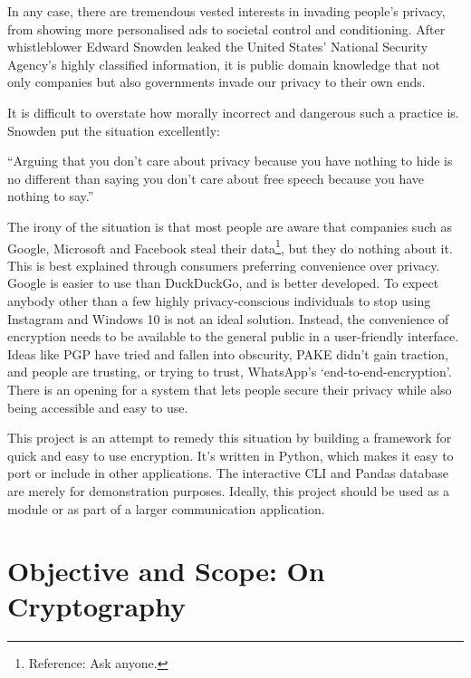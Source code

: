 \documentclass[titlepage]{article}
\begin{document}
In any case, there are tremendous vested interests in invading people's privacy, from showing more
personalised ads to societal control and conditioning. After whistleblower Edward Snowden leaked
the United States' National Security Agency's highly classified information, it is public domain
knowledge that not only companies but also governments invade our privacy to their own ends.

It is difficult to overstate how morally incorrect and dangerous such a practice is. Snowden put the
situation excellently:

\begin{displayquote}
  ``Arguing that you don't care about privacy because you have nothing to hide is no different than
  saying you don't care about free speech because you have nothing to say.''
\end{displayquote}

The irony of the situation is that most people are aware that companies such as Google, Microsoft and Facebook
steal their data\footnote{Reference: Ask anyone.}, but they do nothing about it. This is best
explained through consumers preferring convenience over privacy. Google is easier to use than
DuckDuckGo, and is better developed. To expect anybody other than a few highly privacy-conscious
individuals to stop using Instagram and Windows 10 is not an ideal solution. Instead, the convenience
of encryption needs to be available to the general public in a user-friendly interface. Ideas like
PGP have tried and fallen into obscurity, PAKE didn't gain traction\cite{pake}, and people are
trusting, or trying to trust, WhatsApp's `end-to-end-encryption'. There is an opening for a system
that lets people secure their privacy while also being accessible and easy to
use.\cite{hackernews}\cite{gtank}

This project is an attempt to remedy this situation by building a framework for quick and easy to
use encryption. It's written in Python, which makes it easy to port or include in other
applications. The interactive CLI and Pandas database are merely for demonstration purposes.
Ideally, this project should be used as a module or as part of a larger communication application.


\cleardoublepage

\section{Objective and Scope: On Cryptography}
\end{document}
